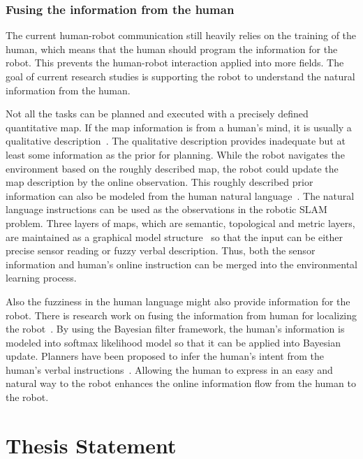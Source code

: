 \documentclass[phd]{byuprop}
\begin{document}
\subsubsection{Fusing the information from the human}

The current human-robot communication still heavily relies on the training of the human, which means that the human should program the information for the robot.
This prevents the human-robot interaction applied into more fields.
The goal of current research studies is supporting the robot to understand the natural information from the human.
 
Not all the tasks can be planned and executed with a precisely defined quantitative map.
If the map information is from a human's mind, it is usually a qualitative description~\cite{mcclelland2012qualitative,6425551,mcclelland2014qualitative,shah2013qualitative}.
The qualitative description provides inadequate but at least some information as the prior for planning.
While the robot navigates the environment based on the roughly described map, the robot could update the map description by the online observation.
This roughly described prior information can also be modeled from the human natural language~\cite{tellex2011understanding,walter2014framework}.
The natural language instructions can be used as the observations in the robotic SLAM problem.
Three layers of maps, which are semantic, topological and metric layers, are maintained as a graphical model structure~\cite{walter2014framework} so that the input can be either precise sensor reading or fuzzy verbal description.
Thus, both the sensor information and human's online instruction can be merged into the environmental learning process.

Also the fuzziness in the human language might also provide information for the robot.
There is research work on fusing the information from human for localizing the robot~\cite{6301744,5509521,ahmed2014enabling}.
By using the Bayesian filter framework, the human's information is modeled into softmax likelihood model so that it can be applied into Bayesian update.
Planners have been proposed to infer the human's intent from the human's verbal instructions~\cite{howard2014natural,Duvallet_2014_7795}.
Allowing the human to express in an easy and natural way to the robot enhances the online information flow from the human to the robot.

\section{Thesis Statement}
\end{document}
